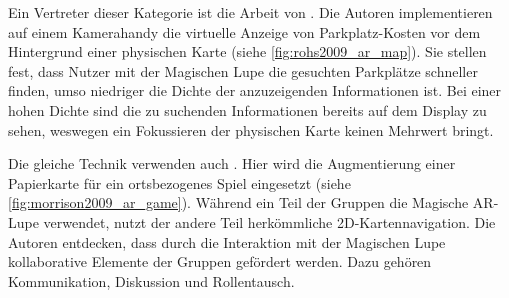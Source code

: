 Ein Vertreter dieser Kategorie ist die Arbeit von \textcite{Rohs2009}.
Die Autoren implementieren auf einem Kamerahandy die virtuelle Anzeige von Parkplatz-Kosten vor dem Hintergrund einer physischen Karte (siehe \autoref{fig:rohs2009_ar_map}).
Sie stellen fest, dass Nutzer mit der Magischen Lupe die gesuchten Parkplätze schneller finden, umso niedriger die Dichte der anzuzeigenden Informationen ist.
Bei einer hohen Dichte sind die zu suchenden Informationen bereits auf dem Display zu sehen, weswegen ein Fokussieren der physischen Karte keinen Mehrwert bringt.

Die gleiche Technik verwenden auch \textcite{Morrison2009}.
Hier wird die Augmentierung einer Papierkarte für ein ortsbezogenes Spiel eingesetzt (siehe \autoref{fig:morrison2009_ar_game}).
Während ein Teil der Gruppen die Magische AR-Lupe verwendet, nutzt der andere Teil herkömmliche 2D-Kartennavigation.
Die Autoren entdecken, dass durch die Interaktion mit der Magischen Lupe kollaborative Elemente der Gruppen gefördert werden.
Dazu gehören Kommunikation, Diskussion und Rollentausch.

